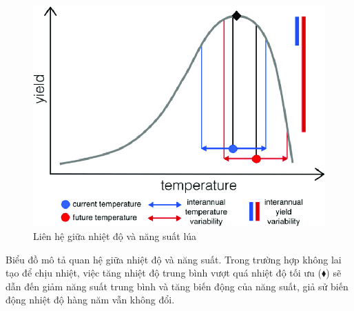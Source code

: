 \documentclass[12pt]{report}
\begin{document}
\begin{flushleft}
	\begin{figure}[H]
		\centering
		\caption{Liên hệ giữa nhiệt độ và năng suất lúa}
		\includegraphics[width = \textwidth]{images/sodonhietdo.png}
	\end{figure}

	Biểu đồ mô tả quan hệ giữa nhiệt độ và năng suất. Trong trường hợp không lai tạo để chịu nhiệt, việc tăng nhiệt độ trung bình vượt quá nhiệt độ tối ưu (${\blacklozenge}$) sẽ dẫn đến giảm năng suất trung bình và tăng biến động của năng suất, giả sử biến động nhiệt độ hàng năm vẫn không đổi.
\end{flushleft}
\end{document}
